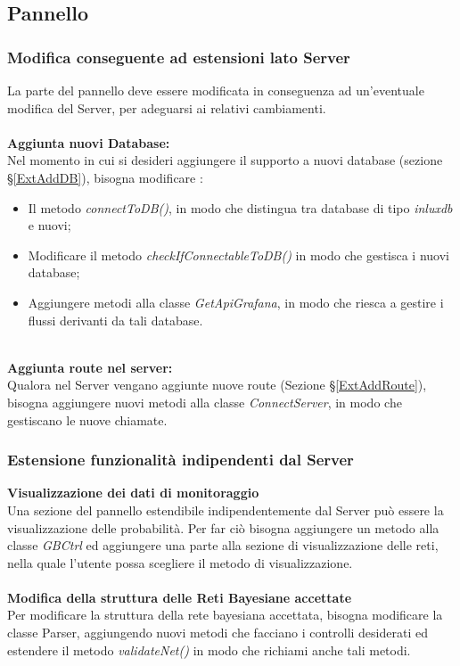 \subsection{Pannello}\label{estensionePlugin}

\subsubsection{Modifica conseguente ad estensioni lato Server}
La parte del pannello deve essere modificata in conseguenza ad un'eventuale modifica del Server, per adeguarsi ai relativi cambiamenti.\\
~\\
\textbf{Aggiunta nuovi Database:}\\
Nel momento in cui si desideri aggiungere il supporto a nuovi database (sezione §\ref{ExtAddDB}), bisogna modificare :
\begin{itemize}
	\item Il metodo \textit{connectToDB()}, in modo che distingua tra database di tipo \textit{inluxdb} e nuovi;
	\item Modificare il metodo \textit{checkIfConnectableToDB()} in modo che gestisca i nuovi database;
	\item Aggiungere metodi alla classe \textit{GetApiGrafana}, in modo che riesca a gestire i flussi derivanti da tali database.
\end{itemize}
~\\
\textbf{Aggiunta route nel server:}\\
Qualora nel Server vengano aggiunte nuove route (Sezione §\ref{ExtAddRoute}), bisogna aggiungere nuovi metodi alla classe \textit{ConnectServer}, in modo che gestiscano le nuove chiamate.\\


\subsubsection{Estensione funzionalità indipendenti dal Server}
\textbf{Visualizzazione dei dati di monitoraggio}\\
Una sezione del pannello estendibile indipendentemente dal Server può essere la visualizzazione delle probabilità. Per far ciò bisogna  aggiungere un metodo alla classe \textit{GBCtrl} ed aggiungere una parte alla sezione di visualizzazione delle reti, nella quale l'utente possa scegliere il metodo di visualizzazione.\\
~\\
\textbf{Modifica della struttura delle Reti Bayesiane accettate}\\
Per modificare la struttura della rete bayesiana accettata, bisogna modificare la classe Parser, aggiungendo nuovi metodi che facciano i controlli desiderati ed estendere il metodo \textit{validateNet()} in modo che richiami anche tali metodi.
